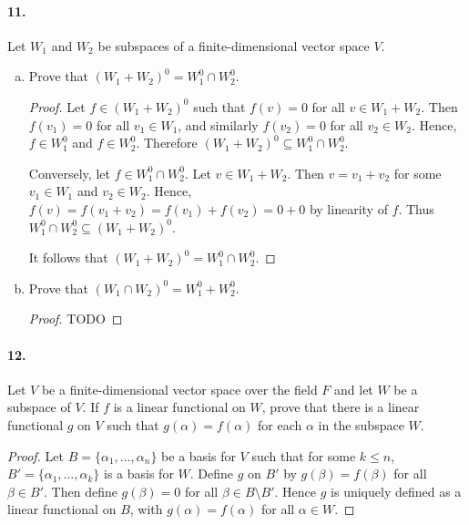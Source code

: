 \documentclass{article}
\begin{document}
\paragraph{11.} Let $W_1$ and $W_2$ be subspaces of a finite-dimensional vector
space $V$.

\begin{enumerate}[(a)]
  \item Prove that $(W_1 + W_2)^0 = W_1^0 \cap W_2^0$.
    \begin{proof}
      Let $f \in (W_1 + W_2)^0$ such that $f(v) = 0$ for all $v \in W_1 + W_2$.
      Then $f(v_1) = 0$ for all $v_1 \in W_1$, and similarly $f(v_2) = 0$ for
      all $v_2 \in W_2$. Hence, $f \in W_1^0$ and $f \in W_2^0$. Therefore
      $(W_1 + W_2)^0 \subseteq W_1^0 \cap W_2^0$.

      Conversely, let $f \in W_1^0 \cap W_2^0$. Let $v \in W_1 + W_2$. Then $v =
      v_1 + v_2$ for some $v_1 \in W_1$ and $v_2 \in W_2$. Hence, $f(v) = f(v_1
      + v_2) = f(v_1) + f(v_2) = 0 + 0$ by linearity of $f$. Thus $W_1^0 \cap
      W_2^0 \subseteq (W_1 + W_2)^0$.

      It follows that $(W_1 + W_2)^0 = W_1^0 \cap W_2^0$.
    \end{proof}
  \item Prove that $(W_1 \cap W_2)^0 = W_1^0 + W_2^0$.
    \begin{proof}
      TODO
    \end{proof}
\end{enumerate}

\paragraph{12.} Let $V$ be a finite-dimensional vector space over the field $F$
and let $W$ be a subspace of $V$. If $f$ is a linear functional on $W$, prove
that there is a linear functional $g$ on $V$ such that $g(\alpha) = f(\alpha)$
for each $\alpha$ in the subspace $W$.

\begin{proof}
  Let $B = \{\alpha_1, \ldots, \alpha_n\}$ be a basis for $V$ such that for some
  $k \leq n$, $B' = \{\alpha_1, \ldots, \alpha_k\}$ is a basis for $W$. Define
  $g$ on $B'$ by $g(\beta) = f(\beta)$ for all $\beta \in B'$. Then define
  $g(\beta) = 0$ for all $\beta \in B \setminus B'$. Hence $g$ is uniquely
  defined as a linear functional on $B$, with $g(\alpha) = f(\alpha)$ for all
  $\alpha \in W$.
\end{proof}
\end{document}
